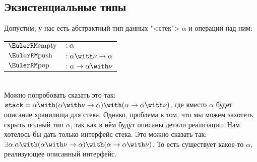 \subsection*{\texorpdfstring{Экзистенциальные типы}{Existential types}}

Допустим, у нас есть абстрактный тип данных "<стек"> $\alpha$ и операции над ним: \\
\begin{tabular}{l l}
    $\func{empty}$ & $: \alpha$ \\
    $\func{push}$  & $: \alpha\with\nu\to\alpha$ \\
    $\func{pop}$   & $: \alpha\to\alpha\with\nu$ \\
\end{tabular} \\
Можно попробовать сказать это так: $\mathtt{stack} =
    \alpha \with (\alpha\with\nu\to\alpha) \with (\alpha\to\alpha\with\nu)$, где вместо $\alpha$ будет описание хранилища для стека.
Однако, проблема в том, что мы можем захотеть скрыть полный тип $\alpha$, так как в нём будут описаны детали реализации.
Нам хотелось бы дать только интерфейс стека. Это можно сказать так:
    $\exists \alpha . \alpha \with (\alpha\with\nu\to\alpha) \with (\alpha\to\alpha\with\nu)$.
То есть существует какое-то $\alpha$, реализующее описанный интерфейс.

